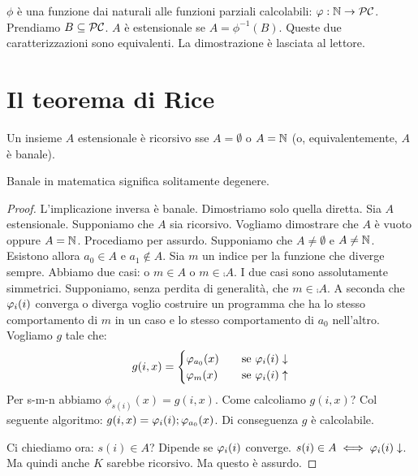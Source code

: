 $\phi$ è una funzione dai naturali alle funzioni parziali calcolabili: $\varphi : \mathbb{N} \to \mathcal{PC}$.
Prendiamo $B \subseteq \mathcal{PC}$. $A$ è estensionale se $A = \phi^{-1}(B)$. Queste due caratterizzazioni
sono equivalenti. La dimostrazione è lasciata al lettore.

\section{Il teorema di Rice}

\begin{thm}
    Un insieme $A$ estensionale è ricorsivo sse $A = \emptyset$ o $A = \mathbb{N}$ (o, equivalentemente,
    $A$ è banale).
\end{thm}

Banale in matematica significa solitamente degenere.

\begin{proof}
    L'implicazione inversa è banale. Dimostriamo solo quella diretta. Sia $A$ estensionale.
    Supponiamo che $A$ sia ricorsivo. Vogliamo dimostrare che $A$ è vuoto oppure $A = \mathbb{N}$.
    Procediamo per assurdo. Supponiamo che $A \not= \emptyset$ e $A \not= \mathbb{N}$. Esistono
    allora $a_{0} \in A$ e $a_{1} \notin A$. Sia $m$ un indice per la funzione che diverge sempre.
    Abbiamo due casi: o $m \in A$ o $m \in \comp{A}$. I due casi sono assolutamente simmetrici.
    Supponiamo, senza perdita di generalità, che $m \in \comp{A}$. A seconda che $\varphi_{i}(i)$ converga
    o diverga voglio costruire un programma che ha lo stesso comportamento di $m$ in un caso e lo
    stesso comportamento di $a_{0}$ nell'altro. Vogliamo $g$ tale che:
    \begin{equation*}
        g(i,x) = 
        \begin{cases}
            \varphi_{a_{0}}(x) \quad &\text{se $\varphi_{i}(i) \downarrow$} \\
            \varphi_{m}(x) \quad &\text{se $\varphi_{i}(i) \uparrow$} \\
        \end{cases}
    \end{equation*}
    Per s-m-n abbiamo $\phi_{s(i)}(x) = g(i,x)$. Come calcoliamo $g(i,x)$? Col seguente algoritmo:
    $g(i,x) = \varphi_{i}(i); \varphi_{a_{0}}(x)$. Di conseguenza $g$ è calcolabile. 
    
    Ci chiediamo ora: $s(i) \in A$? Dipende se $\varphi_{i}(i)$ converge. $s(i) \in A \iff \varphi_{i}(i)
    \downarrow$. Ma quindi anche $K$ sarebbe ricorsivo. Ma questo è assurdo.
\end{proof}


